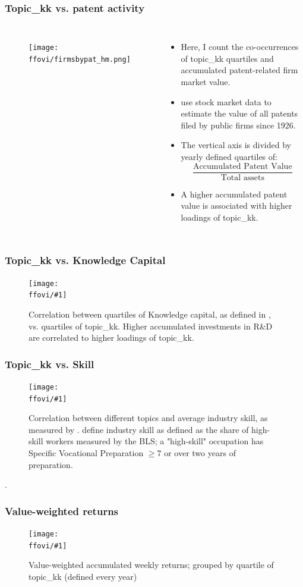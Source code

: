 \documentclass{beamer}
\newcommand{\ffovi}{dicfullmc10thr10defnob5noa0_8_6t}
\newcommand{\insertfigurevi}[2]{
\begin{figure}[h!]
  \centering
  \texttt{[image: \\ffovi/\#1]}
  \centering
  \captionsetup{font=scriptsize}
  \caption{#2}
  \label{fig:#1}
\end{figure}
}
\begin{document}
\begin{frame}
\frametitle{Topic\_kk vs. patent activity}
       \begin{columns}
             \begin{figure}[h!]
		  \centering
		  \texttt{[image: \\ffovi/firmsbypat\_hm.png]}
		  \captionsetup{font=scriptsize}
		  \label{fig:firmsbypathm}
			\end{figure}
          \scriptsize
              \begin{itemize}
              \item Here, I count the co-occurrences of topic\_kk quartiles and accumulated patent-related firm market value.
              \item \cite{Kogan2017-fx} use stock market data to estimate the value of all patents filed by public firms since 1926.
			  \item The vertical axis is divided by yearly defined quartiles of:
			  \begin{equation}
  				\frac{\text{Accumulated Patent Value}}{\text{Total assets}}
				\end{equation}
			  \item A higher accumulated patent value is associated with higher loadings of topic\_kk.
			\end{itemize}
	  \end{columns} 
\end{frame}

\begin{frame}
\frametitle{Topic\_kk vs. Knowledge Capital}
\scriptsize
\insertfigurevi{topicvskkpt_hm}{Correlation between quartiles of Knowledge capital,  as defined in \cite{Peters2017-fl}, vs. quartiles of topic\_kk. Higher accumulated investments in R\&D are correlated to higher loadings of topic\_kk.}
\end{frame}

\begin{frame}
\frametitle{Topic\_kk vs. Skill}
\scriptsize
\insertfigurevi{heatmap}{Correlation between different topics and average industry skill, as measured by \cite{Belo2017-qi}. \cite{Belo2017-qi} define industry skill as defined as the share of high-skill workers measured by the BLS; a "high-skill" occupation has Specific Vocational Preparation $\geq 7$ or over two years of preparation.}. 
\end{frame}

\begin{frame}
\frametitle{Value-weighted returns}
\insertfigurevi{awawr}{Value-weighted accumulated weekly returns; grouped by quartile of topic\_kk (defined every year)}
\end{frame}
\end{document}
